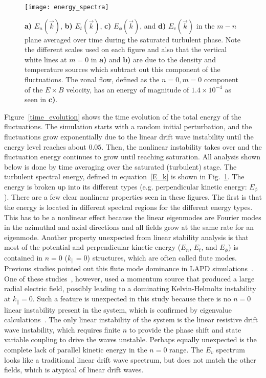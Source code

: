 \documentclass[showpacs,preprintnumbers,amsmath,amssymb,superscriptaddress,aip]{revtex4-1}
\def\para{\parallel}
\begin{document}
\begin{figure}[!htbp]
\texttt{[image: energy\_spectra]}
\hfil
\caption{\textbf{a)} $E_n(\vec{k})$, \textbf{b)} $E_t(\vec{k})$, \textbf{c)} $E_\phi(\vec{k})$, and \textbf{d)} $E_v(\vec{k})$ in the $m-n$ plane averaged over time during the saturated turbulent phase.
Note the different scales used on each figure and also that the vertical white lines at $m=0$ in \textbf{a)} and \textbf{b)} are due to the density and temperature sources which subtract out this
component of the fluctuations. The zonal flow, defined as the $n=0, m=0$ component of the $E \times B$ velocity, has an energy of magnitude of $1.4 \times 10^{-4}$ as seen in \textbf{c)}.}
\label{energy_figures}
\end{figure}

Figure~\ref{time_evolution} shows the time evolution of the total energy of the fluctuations. The simulation starts with a random initial perturbation, and the fluctuations grow
exponentially due to the linear drift wave instability until the energy level reaches about $0.05$. Then, the nonlinear instability takes over and the fluctuation energy continues to grow
until reaching saturation. All analysis shown below is done by time averaging over the saturated (turbulent) stage.
The turbulent spectral energy, defined in equation~\ref{E_k} is shown in Fig.~\ref{energy_figures}. The energy is broken up into its different types (e.g. perpendicular kinetic energy: $E_\phi$).
There are a few clear nonlinear properties
seen in these figures. The first is that the energy is located in different spectral regions for the different energy types. This has to be a nonlinear effect because the linear eigenmodes
are Fourier modes in the azimuthal and axial directions and all fields grow at the same rate for an eigenmode. 
Another property unexpected from linear stability analysis is that most of the potential and perpendicular kinetic energy ($E_n$, $E_t$, and $E_\phi$) is contained in $n=0$ ($k_\para = 0$) 
structures, which are often called flute modes. Previous studies pointed out this flute mode dominance in LAPD simulations~\cite{rogers2010,Umansky2011}. One of these studies~\cite{rogers2010},
however, used a momentum source that produced a large radial electric field, possibly leading to a dominating Kelvin-Helmoltz instability at $k_\para = 0$.
Such a feature is unexpected in this study because there is no $n=0$ linear instability present in the system, which is confirmed by eigenvalue calculations~\cite{Popovich2010a}.
The only linear instability of the system is the
linear resistive drift wave instability, which requires finite $n$ to provide the phase shift and state variable coupling to drive the waves unstable. Perhaps equally unexpected is the complete
lack of parallel kinetic energy in the $n=0$ range. The $E_v$ spectrum looks like a traditional linear drift wave spectrum, but does not match the other fields, which is atypical of
linear drift waves.
\end{document}
